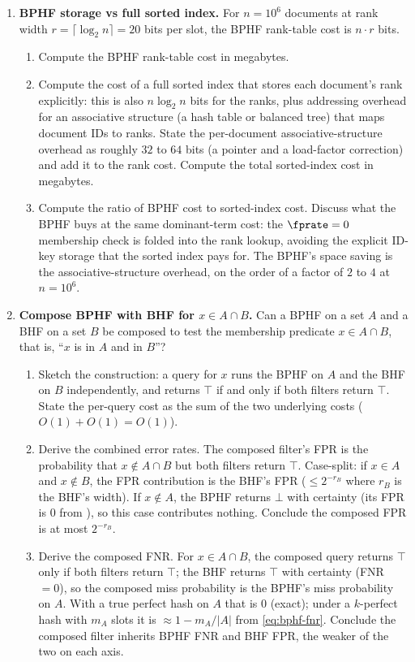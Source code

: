 \begin{enumerate}
\item \exstarstar
\label{ex:ch15-6}
\textbf{BPHF storage vs full sorted index.}
For $n = 10^6$ documents at rank width $r = \lceil \log_2 n \rceil =
20$ bits per slot, the BPHF rank-table cost is $n \cdot r$ bits.
\begin{enumerate}
  \item[(a)] Compute the BPHF rank-table cost in megabytes.
  \item[(b)] Compute the cost of a full sorted index that stores
    each document's rank explicitly: this is also $n \log_2 n$ bits
    for the ranks, plus addressing overhead for an associative
    structure (a hash table or balanced tree) that maps document IDs
    to ranks. State the per-document associative-structure overhead
    as roughly $32$ to $64$ bits (a pointer and a load-factor
    correction) and add it to the rank cost. Compute the total
    sorted-index cost in megabytes.
  \item[(c)] Compute the ratio of BPHF cost to sorted-index cost.
    Discuss what the BPHF buys at the same dominant-term cost: the
    $\fprate = 0$ membership check is folded into the rank lookup,
    avoiding the explicit ID-key storage that the sorted index pays
    for. The BPHF's space saving is the associative-structure
    overhead, on the order of a factor of $2$ to $4$ at $n = 10^6$.
\end{enumerate}

\item \exstarstar
\label{ex:ch15-7}
\textbf{Compose BPHF with BHF for $x \in A \cap B$.}
Can a BPHF on a set $A$ and a BHF on a set $B$ be composed to test
the membership predicate $x \in A \cap B$, that is, ``$x$ is in
$A$ and in $B$''?
\begin{enumerate}
  \item[(a)] Sketch the construction: a query for $x$ runs the BPHF
    on $A$ and the BHF on $B$ independently, and returns $\top$ if
    and only if both filters return $\top$. State the per-query
    cost as the sum of the two underlying costs ($O(1) + O(1) =
    O(1)$).
  \item[(b)] Derive the combined error rates. The composed
    filter's FPR is the probability that $x \notin A \cap B$ but
    both filters return $\top$. Case-split: if $x \in A$ and $x
    \notin B$, the FPR contribution is the BHF's FPR ($\le 2^{-r_B}$
    where $r_B$ is the BHF's width). If $x \notin A$, the BPHF
    returns $\bot$ with certainty (its FPR is $0$ from
    ), so this case contributes nothing. Conclude
    the composed FPR is at most $2^{-r_B}$.
  \item[(c)] Derive the composed FNR. For $x \in A \cap B$, the
    composed query returns $\top$ only if both filters return
    $\top$; the BHF returns $\top$ with certainty (FNR $= 0$), so
    the composed miss probability is the BPHF's miss probability
    on $A$. With a true perfect hash on $A$ that is $0$ (exact);
    under a $k$-perfect hash with $m_A$ slots it is
    $\approx 1 - m_A / |A|$ from \eqref{eq:bphf-fnr}. Conclude the
    composed filter inherits BPHF FNR and BHF FPR, the weaker of the
    two on each axis.
\end{enumerate}


\end{enumerate}
